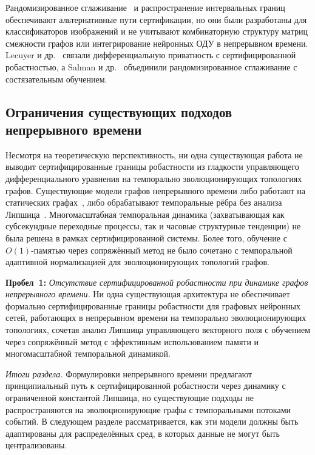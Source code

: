 Рандомизированное сглаживание~\cite{Cohen2019} и распространение интервальных границ~\cite{Gowal2019} обеспечивают альтернативные пути сертификации, но они были разработаны для классификаторов изображений и не учитывают комбинаторную структуру матриц смежности графов или интегрирование нейронных ОДУ в непрерывном времени. Lecuyer и др.~\cite{Lecuyer2019} связали дифференциальную приватность с сертифицированной робастностью, а Salman и др.~\cite{Salman2019} объединили рандомизированное сглаживание с состязательным обучением.

\subsection{Ограничения существующих подходов непрерывного времени}

Несмотря на теоретическую перспективность, ни одна существующая работа не выводит сертифицированные границы робастности из гладкости управляющего дифференциального уравнения на темпорально эволюционирующих топологиях графов. Существующие модели графов непрерывного времени либо работают на статических графах~\cite{Chamberlain2021}, либо обрабатывают темпоральные рёбра без анализа Липшица~\cite{Xu2020tgat,Rossi2020,Pei2020tgn,Kazemi2020,Wang2021tedic}. Многомасштабная темпоральная динамика (захватывающая как субсекундные переходные процессы, так и часовые структурные тенденции) не была решена в рамках сертифицированной системы. Более того, обучение с $O(1)$-памятью через сопряжённый метод не было сочетано с темпоральной адаптивной нормализацией для эволюционирующих топологий графов.

\noindent\textbf{Пробел~1:} \emph{Отсутствие сертифицированной робастности при динамике графов непрерывного времени.} Ни одна существующая архитектура не обеспечивает формально сертифицированные границы робастности для графовых нейронных сетей, работающих в непрерывном времени на темпорально эволюционирующих топологиях, сочетая анализ Липшица управляющего векторного поля с обучением через сопряжённый метод с эффективным использованием памяти и многомасштабной темпоральной динамикой.

\medskip
\noindent\textit{Итоги раздела.} Формулировки непрерывного времени предлагают принципиальный путь к сертифицированной робастности через динамику с ограниченной константой Липшица, но существующие подходы не распространяются на эволюционирующие графы с темпоральными потоками событий. В следующем разделе рассматривается, как эти модели должны быть адаптированы для распределённых сред, в которых данные не могут быть централизованы.

